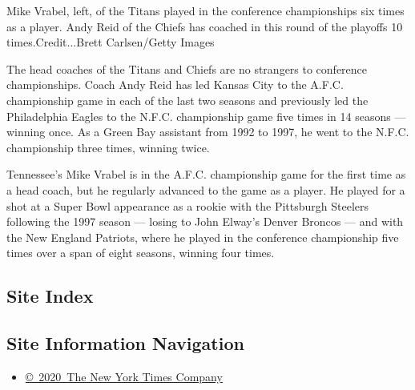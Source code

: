 Mike Vrabel, left, of the Titans played in the conference championships
six times as a player. Andy Reid of the Chiefs has coached in this round
of the playoffs 10 times.Credit...Brett Carlsen/Getty Images

The head coaches of the Titans and Chiefs are no strangers to conference
championships. Coach Andy Reid has led Kansas City to the A.F.C.
championship game in each of the last two seasons and previously led the
Philadelphia Eagles to the N.F.C. championship game five times in 14
seasons --- winning once. As a Green Bay assistant from 1992 to 1997, he
went to the N.F.C. championship three times, winning twice.

Tennessee's Mike Vrabel is in the A.F.C. championship game for the first
time as a head coach, but he regularly advanced to the game as a player.
He played for a shot at a Super Bowl appearance as a rookie with the
Pittsburgh Steelers following the 1997 season --- losing to John Elway's
Denver Broncos --- and with the New England Patriots, where he played in
the conference championship five times over a span of eight seasons,
winning four times.

\hypertarget{site-index}{%
\subsection{Site Index}\label{site-index}}

\hypertarget{site-information-navigation}{%
\subsection{Site Information
Navigation}\label{site-information-navigation}}

\begin{itemize}
\tightlist
\item
  \href{https://help.nytimes3xbfgragh.onion/hc/en-us/articles/115014792127-Copyright-notice}{©~2020~The
  New York Times Company}
\end{itemize}

